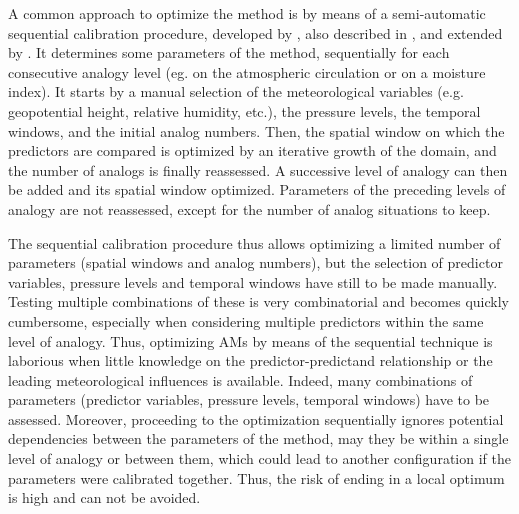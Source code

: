 \documentclass{ametsoc}
\begin{document}
A common approach to optimize the method is by means of a semi-automatic sequential calibration procedure, developed by \citet{Bontron2004}, also described in \citet{BenDaoud2016}, and extended by \citet{Radanovics2013}. It determines some parameters of the method, sequentially for each consecutive analogy level (eg. on the atmospheric circulation or on a moisture index). It starts by a manual selection of the meteorological variables (e.g. geopotential height, relative humidity, etc.), the pressure levels, the temporal windows, and the initial analog numbers. Then, the spatial window on which the predictors are compared is optimized by an iterative growth of the domain, and the number of analogs is finally reassessed. A successive level of analogy can then be added and its spatial window optimized. Parameters of the preceding levels of analogy are not reassessed, except for the number of analog situations to keep.

The sequential calibration procedure thus allows optimizing a limited number of parameters (spatial windows and analog numbers), but the selection of predictor variables, pressure levels and temporal windows have still to be made manually. Testing multiple combinations of these is very combinatorial and becomes quickly cumbersome, especially when considering multiple predictors within the same level of analogy. Thus, optimizing AMs by means of the sequential technique is laborious when little knowledge on the predictor-predictand relationship or the leading meteorological influences is available. Indeed, many combinations of parameters (predictor variables, pressure levels, temporal windows) have to be assessed. Moreover, proceeding to the optimization sequentially ignores potential dependencies between the parameters of the method, may they be within a single level of analogy or between them, which could lead to another configuration if the parameters were calibrated together. Thus, the risk of ending in a local optimum is high and can not be avoided. 
\end{document}
